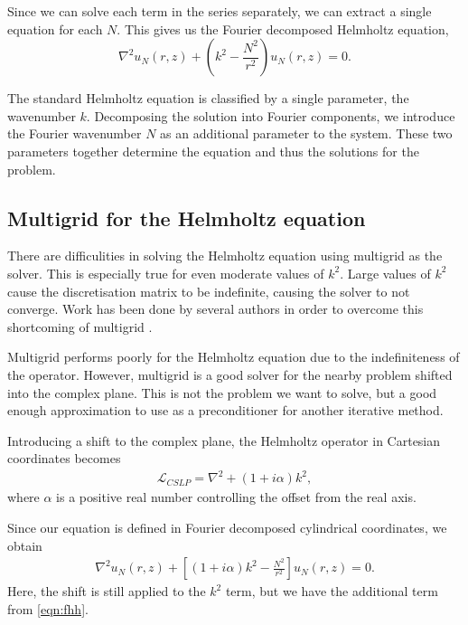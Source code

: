 Since we can solve each term in the series separately, we can extract a single equation for each $N$.
This gives us the Fourier decomposed Helmholtz equation,
\begin{equation}
	\nabla^2 u_N(r,z) + (k^2 - \frac{N^2}{r^2})u_N(r,z) = 0. \label{eqn:fhh}
\end{equation}

The standard Helmholtz equation is classified by a single parameter, the wavenumber $k$.
Decomposing the solution into Fourier components, we introduce the Fourier wavenumber $N$ as an additional parameter to the system.
These two parameters together determine the equation and thus the solutions for the problem.








\subsection{Multigrid for the Helmholtz equation}

There are difficulities in solving the Helmholtz equation using multigrid as the solver.
This is especially true for even moderate values of $k^2$.
Large values of $k^2$ cause the discretisation matrix to be indefinite, causing the solver to not converge.
Work has been done by several authors in order to overcome this shortcoming of multigrid \cite{cslp1, cslp2}.

Multigrid performs poorly for the Helmholtz equation due to the indefiniteness of the operator.
However, multigrid is a good solver for the nearby problem shifted into the complex plane.
This is not the problem we want to solve, but a good enough approximation to use as a preconditioner for another iterative method.

Introducing a shift to the complex plane, the Helmholtz operator in Cartesian coordinates becomes
\begin{align}
	\mathcal{L}_{CSLP} = \nabla^2 + (1 + i \alpha ) k^2,  \label{eqn:cslp}
\end{align}
where $\alpha$ is a positive real number controlling the offset from the real axis.

Since our equation is defined in Fourier decomposed cylindrical coordinates, we obtain 
\begin{align}
	\nabla^2 u_N(r,z) + \left[ \left( 1 + i \alpha \right) k^2 - \frac{N^2}{r^2} \right] u_N(r,z) = 0.
\end{align}
Here, the shift is still applied to the $k^2$ term, but we have the additional term from \eqref{eqn:fhh}.

